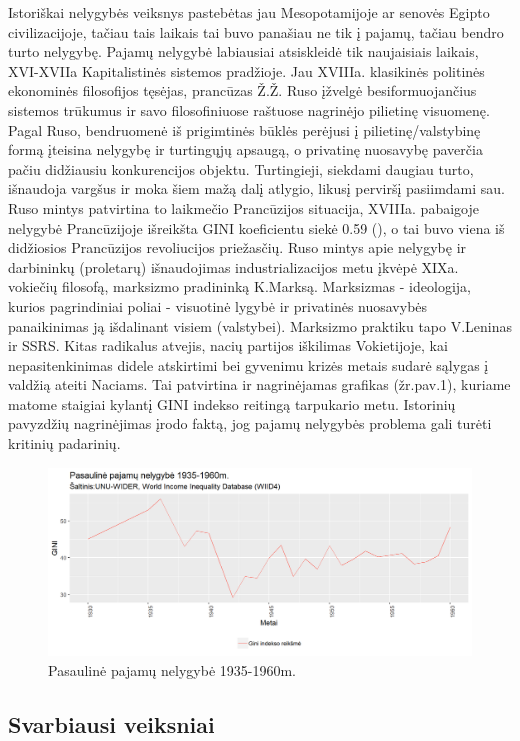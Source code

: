 \documentclass[12pt,a4paper,titlepage]{article}
\begin{document}
Istoriškai nelygybės veiksnys pastebėtas jau Mesopotamijoje ar senovės Egipto civilizacijoje, tačiau tais laikais tai buvo panašiau ne tik į pajamų, tačiau bendro turto nelygybę. Pajamų nelygybė labiausiai atsiskleidė tik naujaisiais laikais, XVI-XVIIa Kapitalistinės sistemos pradžioje. Jau XVIIIa. klasikinės politinės ekonominės filosofijos tęsėjas, prancūzas Ž.Ž. Ruso įžvelgė besiformuojančius sistemos trūkumus ir savo filosofiniuose raštuose nagrinėjo pilietinę visuomenę. Pagal Ruso, bendruomenė iš prigimtinės būklės perėjusi į pilietinę/valstybinę formą įteisina nelygybę ir turtingųjų apsaugą, o privatinę nuosavybę paverčia pačiu didžiausiu konkurencijos objektu. Turtingieji, siekdami daugiau turto, išnaudoja vargšus ir moka šiem mažą dalį atlygio, likusį perviršį pasiimdami sau. Ruso mintys patvirtina to laikmečio Prancūzijos situacija, XVIIIa. pabaigoje nelygybė Prancūzijoje išreikšta GINI koeficientu siekė 0.59 (\cite{morrisson2000income}), o tai buvo viena iš didžiosios Prancūzijos revoliucijos priežasčių. Ruso mintys apie nelygybę ir darbininkų (proletarų) išnaudojimas industrializacijos metu įkvėpė XIXa. vokiečių filosofą, marksizmo pradininką K.Marksą. Marksizmas - ideologija, kurios pagrindiniai poliai - visuotinė lygybė ir privatinės nuosavybės panaikinimas ją išdalinant visiem (valstybei). Marksizmo praktiku tapo V.Leninas ir SSRS. Kitas radikalus atvejis, nacių partijos iškilimas Vokietijoje, kai nepasitenkinimas didele atskirtimi bei gyvenimu krizės metais sudarė sąlygas į valdžią ateiti Naciams. Tai patvirtina ir nagrinėjamas grafikas (žr.pav.1), kuriame matome staigiai kylantį GINI indekso reitingą tarpukario metu. Istorinių pavyzdžių nagrinėjimas įrodo faktą, jog pajamų nelygybės problema gali turėti kritinių padarinių.
\begin{figure}[H]
\includegraphics[scale=0.7]{historicalinequality3560.png}
\caption{Pasaulinė pajamų nelygybė 1935-1960m.}
\end{figure}
\subsection{Svarbiausi veiksniai}
\end{document}
